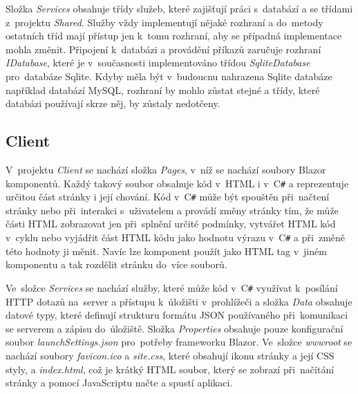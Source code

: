 \documentclass[a4paper,12pt]{article}
\def\CS{C\texttt{\#}}
\begin{document}
Složka \textit{Services} obsahuje třídy služeb, které zajišťují práci s~databází a se třídami z~projektu \textit{Shared}. Služby vždy implementují nějaké rozhraní a do~metody ostatních tříd mají přístup jen k~tomu rozhraní, aby se případná implementace mohla změnit. Připojení k~databázi a provádění příkazů zaručuje rozhraní \textit{IDatabase}, které je v~současnosti implementováno třídou \textit{SqliteDatabase} pro~databáze Sqlite. Kdyby měla být v~budoucnu nahrazena Sqlite databáze například databází MySQL, rozhraní by mohlo zůstat stejné a třídy, které databázi používají skrze něj, by zůstaly nedotčeny.

\subsection{Client}
V~projektu \textit{Client} se nachází složka \textit{Pages}, v~níž se nachází soubory Blazor komponentů. Každý takový soubor obsahuje kód v~HTML i v~\CS{} a reprezentuje určitou část stránky i její chování. Kód v~\CS{} může být spouštěn při~načtení stránky nebo při~interakci s~uživatelem a provádí změny stránky tím, že může části HTML zobrazovat jen při~splnění určité podmínky, vytvářet HTML kód v~cyklu nebo vyjádřit část HTML kódu jako hodnotu výrazu v~\CS{} a při~změně této hodnoty ji měnit. Navíc lze komponent použít jako HTML tag v~jiném komponentu a tak rozdělit stránku do~více souborů.

Ve~složce \textit{Services} se nachází služby, které může kód v~\CS{} využívat k~posílání HTTP dotazů na~server a přístupu k~úložišti v~prohlížeči a složka \textit{Data} obsahuje datové typy, které definují strukturu formátu JSON používaného při~komunikaci se serverem a zápisu do~úložiště. Složka \textit{Properties} obsahuje pouze konfigurační soubor \textit{launchSettings.json} pro~potřeby frameworku Blazor. Ve~složce \textit{wwwroot} se nachází soubory \textit{favicon.ico} a \textit{site.css}, které obsahují ikonu stránky a její CSS styly, a \textit{index.html}, což je krátký HTML soubor, který se zobrazí při~načítání stránky a pomocí JavaScriptu načte a spustí aplikaci.

\newpage
\printbibliography[heading=bibintoc, title={Použitá literatura}]
\newpage
\listoffigures
\end{document}
